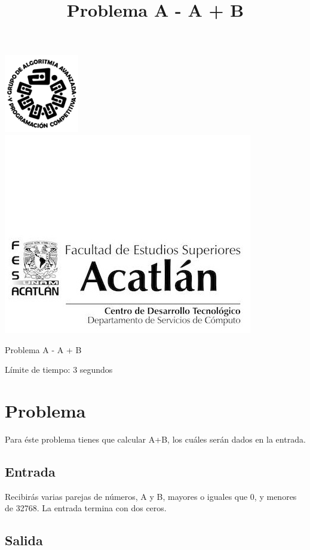 \documentclass[letter,10pt]{article}
\date{}
\begin{document}
\title{Problema A - A + B}

\includegraphics[scale=0.6]{logo} \hspace*{9.00cm}
\includegraphics[scale=0.5]{dsc} 
\bigskip
\begin{center}
	\Large Problema A - A + B
\end{center}

\begin{flushright}
Límite de tiempo: 3 segundos
\par\end{flushright}
\bigskip

\section*{Problema}

Para éste problema tienes que calcular A+B, los cuáles serán dados en la entrada. 

\subsection*{Entrada}

Recibirás varias parejas de números, A y B, mayores o iguales que 0, y menores de 32768. La entrada termina con dos ceros.

\subsection*{Salida}
\end{document}
